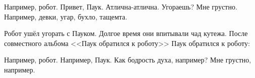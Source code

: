 \begin{dialog}
\X Например, робот.
\X Привет, Паук.
\X Атлична-атлична. Угораешь?
\X Мне грустно.
\X Например, девки, угар, бухло, тащемта.
\end{dialog}

\begin{monolog}
Робот ушёл угорать с Пауком. Долгое время они впитывали чад кутежа. После совместного альбома <<Паук обратился к роботу>> Паук обратился к роботу:
\end{monolog}

\begin{dialog}
\X Например, робот.
\X Например, Паук.
\X Как бодрость духа, например?
\X Мне грустно, например.
\end{dialog}